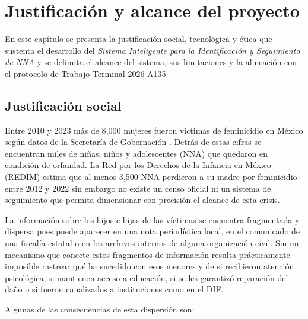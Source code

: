 
\chapter{Justificación y alcance del proyecto}
\label{cap:justificacionAlcance}

En este capítulo se presenta la justificación social, tecnológica y ética que sustenta el desarrollo del
\textit{Sistema Inteligente para la Identificación y Seguimiento de NNA} y se delimita el alcance del sistema,
sus limitaciones y la alineación con el protocolo de Trabajo Terminal 2026-A135.

\section{Justificación social}
\label{sec:justificacionSocial}

Entre 2010 y 2023 más de 8{,}000 mujeres fueron víctimas de feminicidio en México según datos de la Secretaría de Gobernación
\cite{segob2023}. Detrás de estas cifras se encuentran miles de niñas, niños y adolescentes (NNA) que quedaron en condición
de orfandad. La Red por los Derechos de la Infancia en México (REDIM) estima que al menos 3{,}500 NNA perdieron a su madre
por feminicidio entre 2012 y 2022 \cite{redim2023} sin embargo no existe un censo oficial ni un sistema de seguimiento que
permita dimensionar con precisión el alcance de esta crisis.

La información sobre los hijos e hijas de las víctimas se encuentra fragmentada y dispersa pues puede aparecer en una nota
periodística local, en el comunicado de una fiscalía estatal o en los archivos internos de alguna organización civil. Sin
un mecanismo que conecte estos fragmentos de información resulta prácticamente imposible rastrear qué ha sucedido con esos
menores y de si recibieron atención psicológica, si mantienen acceso a educación, si se les garantizó reparación del daño
o si fueron canalizados a instituciones como en el DIF.

Algunas de las consecuencias de esta dispersión son:

